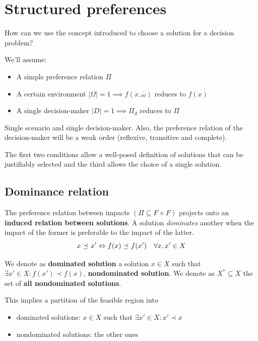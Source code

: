 \chapter{Structured preferences}
\label{ch:structpref}

How can we use the concept introduced to choose a solution for a decision problem? 

We'll assume: 
\begin{itemize}
	\item A simple preference relation $\Pi$
	
	\item A certain environment $|\Omega| = 1 \implies f(x, \bar \omega)$ reduces to $f(x)$
	
	\item A single decision-maker $|D| = 1 \implies \Pi_d$ reduces to $\Pi$
\end{itemize}

Single scenario and single decision-maker. Also, the preference relation of the decision-maker will be a weak order (reflexive, transitive and complete).

The first two conditions allow a well-posed definition of solutions that can be justifiably selected and the third allows the choice of a single solution.

\section{Dominance relation}
\label{sec:dominancerel}

The preference relation between impacts $(\Pi \subseteq F \times F)$ projects onto an \textbf{induced relation between solutions}. A solution \textit{dominates} another when the impact of the former is preferable to the impact of the latter.
$$ x \preceq_{} x' \Leftrightarrow f(x) \preceq_{} f(x') \quad \forall x, x' \in X $$

\begin{definition}
	We denote as \textbf{dominated solution} a solution $x \in X$ such that $\exists x' \in X : f(x') \prec f(x)$, \textbf{nondominated solution}. We denote as $X^\ast \subseteq X$ the set of \textbf{all nondominated solutions}.
\end{definition}

This implies a partition of the feasible region into
\begin{itemize}
	\item dominated solutions: $x \in X$ such that $\exists x' \in X: x' \prec x$
	
	\item nondominated solutions: the other ones
\end{itemize}

